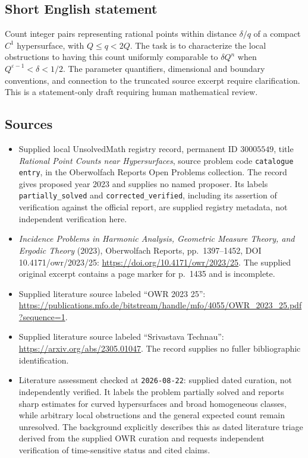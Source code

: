 \documentclass[11pt]{article}
\begin{document}
\subsection{Short English statement}
Count integer pairs representing rational points within distance \(\delta/q\) of a compact \(C^1\) hypersurface, with \(Q\leq q<2Q\). The task is to characterize the local obstructions to having this count uniformly comparable to \(\delta Q^n\) when \(Q^{\varepsilon-1}<\delta<1/2\). The parameter quantifiers, dimensional and boundary conventions, and connection to the truncated source excerpt require clarification. This is a statement-only draft requiring human mathematical review.
\subsection{Sources}
\begin{itemize}
\item Supplied local UnsolvedMath registry record, permanent ID \(30005549\), title \emph{Rational Point Counts near Hypersurfaces}, source problem code \texttt{catalogue entry}, in the Oberwolfach Reports Open Problems collection. The record gives proposed year 2023 and supplies no named proposer. Its labels \texttt{partially\_solved} and \texttt{corrected\_verified}, including its assertion of verification against the official report, are supplied registry metadata, not independent verification here.
\item \emph{Incidence Problems in Harmonic Analysis, Geometric Measure Theory, and Ergodic Theory} (2023), Oberwolfach Reports, pp.\ 1397--1452, DOI 10.4171/owr/2023/25: \url{https://doi.org/10.4171/owr/2023/25}. The supplied original excerpt contains a page marker for p.\ 1435 and is incomplete.
\item Supplied literature source labeled ``OWR 2023 25'': \url{https://publications.mfo.de/bitstream/handle/mfo/4055/OWR_2023_25.pdf?sequence=1}.
\item Supplied literature source labeled ``Srivastava Technau'': \url{https://arxiv.org/abs/2305.01047}. The record supplies no fuller bibliographic identification.
\item Literature assessment checked at \texttt{2026-08-22}: supplied dated curation, not independently verified. It labels the problem partially solved and reports sharp estimates for curved hypersurfaces and broad homogeneous classes, while arbitrary local obstructions and the general expected count remain unresolved. The background explicitly describes this as dated literature triage derived from the supplied OWR curation and requests independent verification of time-sensitive status and cited claims.
\end{itemize}
\end{document}
